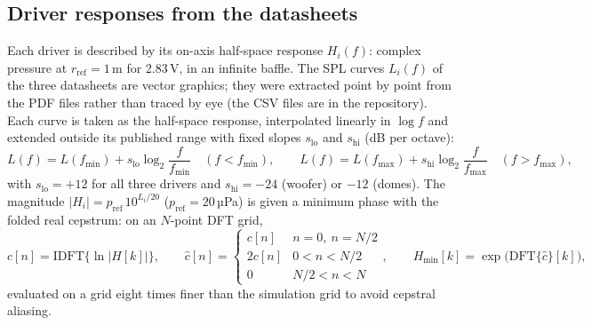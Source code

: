 \documentclass[11pt,a4paper]{article}
\begin{document}
\subsection{Driver responses from the datasheets}
\label{sec:datasheets}

Each driver is described by its on-axis half-space response $H_i(f)$: complex pressure at
$r_\text{ref}=1$\,m for 2.83\,V, in an infinite baffle. The SPL curves $L_i(f)$ of the three
datasheets are vector graphics; they were extracted point by point from the PDF files rather than
traced by eye (the CSV files are in the repository). Each curve is taken as the half-space
response, interpolated linearly in $\log f$ and extended outside its published range with fixed
slopes $s_\text{lo}$ and $s_\text{hi}$ (dB per octave):
\begin{equation}
  L(f) = L(f_\text{min}) + s_\text{lo}\log_2\frac{f}{f_\text{min}} \quad (f<f_\text{min}),\qquad
  L(f) = L(f_\text{max}) + s_\text{hi}\log_2\frac{f}{f_\text{max}} \quad (f>f_\text{max}),
\end{equation}
with $s_\text{lo}=+12$ for all three drivers and $s_\text{hi}=-24$ (woofer) or $-12$ (domes). The
magnitude $|H_i|=p_\text{ref}\,10^{L_i/20}$ ($p_\text{ref}=20$\,µPa) is given a minimum phase with
the folded real cepstrum: on an $N$-point DFT grid,
\begin{equation}
  c[n]=\mathrm{IDFT}\{\ln|H[k]|\},\qquad
  \hat c[n]=\begin{cases} c[n] & n=0,\ n=N/2\\ 2c[n] & 0<n<N/2\\ 0 & N/2<n<N\end{cases},\qquad
  H_\text{min}[k]=\exp\big(\mathrm{DFT}\{\hat c\}[k]\big),
  \label{eq:minphase}
\end{equation}
evaluated on a grid eight times finer than the simulation grid to avoid cepstral aliasing.
\end{document}
